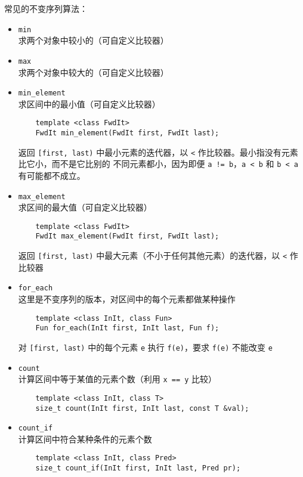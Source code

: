 \documentclass[UTF8]{ctexart}
\begin{document}
常见的不变序列算法：
\begin{itemize}
    \item \texttt{min} \\
    求两个对象中较小的（可自定义比较器）
    \item \texttt{max} \\
    求两个对象中较大的（可自定义比较器）
    \item \texttt{min\_element} \\
    求区间中的最小值（可自定义比较器）
    \begin{verbatim}
    template <class FwdIt>
    FwdIt min_element(FwdIt first, FwdIt last);
    \end{verbatim}
    返回 \texttt{[first, last)} 中最小元素的迭代器，以 \texttt{<} 作比较器。最小指没有元素比它小，而不是它比别的
    不同元素都小，因为即便 \texttt{a != b}，\texttt{a < b} 和 \texttt{b < a} 有可能都不成立。
    \item \texttt{max\_element} \\
    求区间的最大值（可自定义比较器）
    \begin{verbatim}
    template <class FwdIt>
    FwdIt max_element(FwdIt first, FwdIt last);
    \end{verbatim}
    返回 \texttt{[first, last)} 中最大元素（不小于任何其他元素）的迭代器，以 \texttt{<} 作比较器
    \item \texttt{for\_each} \\
    这里是不变序列的版本，对区间中的每个元素都做某种操作
    \begin{verbatim}
    template <class InIt, class Fun>
    Fun for_each(InIt first, InIt last, Fun f);
    \end{verbatim}
    对 \texttt{[first, last)} 中的每个元素 \texttt{e} 执行 \texttt{f(e)}，要求 \texttt{f(e)} 不能改变
    \texttt{e}
    \item \texttt{count} \\
    计算区间中等于某值的元素个数（利用 \texttt{x == y} 比较）
    \begin{verbatim}
    template <class InIt, class T>
    size_t count(InIt first, InIt last, const T &val);
    \end{verbatim}
    \item \texttt{count\_if} \\
    计算区间中符合某种条件的元素个数
    \begin{verbatim}
    template <class InIt, class Pred>
    size_t count_if(InIt first, InIt last, Pred pr);
    \end{verbatim}

\end{itemize}
\end{document}
